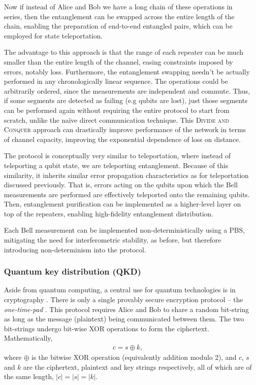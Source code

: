 \documentclass[aps, rmp, twocolumn, amsmath, amssymb, nofootinbib, superscriptaddress, longbibliography, floatfix, table-of-contents, eqsecnum]{revtex4-1}
\begin{document}
Now if instead of Alice and Bob we have a long chain of these operations in series, then the entanglement can be swapped across the entire length of the chain, enabling the preparation of end-to-end entangled pairs, which can be employed for state teleportation.

The advantage to this approach is that the range of each repeater can be much smaller than the entire length of the channel, easing constraints imposed by errors, notably loss. Furthermore, the entanglement swapping needn't be actually performed in any chronologically linear sequence. The operations could be arbitrarily ordered, since the measurements are independent and commute. Thus, if some segments are detected as failing (e.g qubits are lost), just those segments can be performed again without requiring the entire protocol to start from scratch, unlike the na{\" i}ve direct communication technique. This \textsc{Divide and Conquer} approach can drastically improve performance of the network in terms of channel capacity, improving the exponential dependence of loss on distance. 

The protocol is conceptually very similar to teleportation, where instead of teleporting a qubit state, we are teleporting entanglement. Because of this similarity, it inherits similar error propagation characteristics as for teleportation discussed previously. That is, errors acting on the qubits upon which the Bell measurements are performed are effectively teleported onto the remaining qubits. Then, entanglement purification can be implemented as a higher-level layer on top of the repeaters, enabling high-fidelity entanglement distribution.

Each Bell measurement can be implemented non-deterministically using a PBS, mitigating the need for interferometric stability, as before, but therefore introducing non-determinism into the protocol.

%
%

\subsubsection{Quantum key distribution (QKD)} \label{sec:QKD} 

Aside from quantum computing, a central use for quantum technologies is in cryptography \cite{bib:Gisin02}. There is only a single provably secure encryption protocol -- the \textit{one-time-pad} \cite{bib:Schneier96}. This protocol requires Alice and Bob to share a random bit-string as long as the message (plaintext) being communicated between them. The two bit-strings undergo bit-wise XOR operations to form the ciphertext. Mathematically,
\begin{align}
c = s \oplus k,
\end{align}
where $\oplus$ is the bitwise XOR operation (equivalently addition modulo 2), and $c$, $s$ and $k$ are the ciphertext, plaintext and key strings respectively, all of which are of the same length, \mbox{$|c|=|s|=|k|$}.
\end{document}

